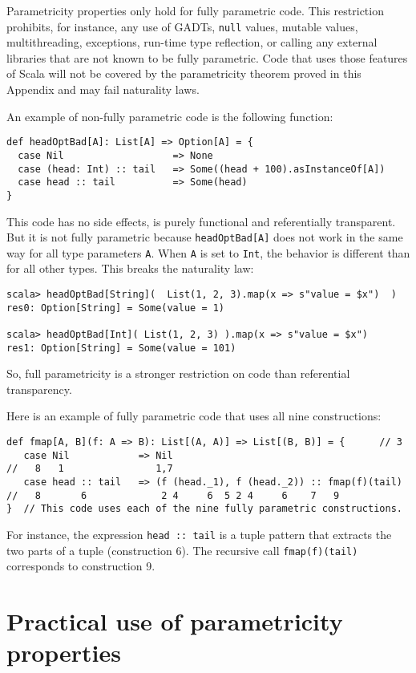 Parametricity properties only hold for fully parametric code.
This restriction prohibits, for instance, any use of GADTs,
\lstinline!null! values, mutable values, multithreading, exceptions,
run-time type reflection, or calling any external libraries that are
not known to be fully parametric. Code that uses those features of
Scala will not be covered by the parametricity theorem proved in this
Appendix and may fail naturality laws. 

An example of non-fully parametric code is the following function:
\begin{lstlisting}
def headOptBad[A]: List[A] => Option[A] = {
  case Nil                   => None
  case (head: Int) :: tail   => Some((head + 100).asInstanceOf[A])
  case head :: tail          => Some(head)
}
\end{lstlisting}
This code has no side effects, is purely functional and referentially
transparent. But it is not fully parametric because \lstinline!headOptBad[A]!
does not work in the same way for all type parameters \lstinline!A!.
When \lstinline!A! is set to \lstinline!Int!, the behavior is different
than for all other types. This breaks the naturality law:
\begin{lstlisting}
scala> headOptBad[String](  List(1, 2, 3).map(x => s"value = $x")  )
res0: Option[String] = Some(value = 1)

scala> headOptBad[Int]( List(1, 2, 3) ).map(x => s"value = $x")
res1: Option[String] = Some(value = 101)
\end{lstlisting}
So, full parametricity is a stronger restriction on code than referential
transparency.

Here is an example of fully parametric code that uses all nine constructions:
\begin{lstlisting}
def fmap[A, B](f: A => B): List[(A, A)] => List[(B, B)] = {      // 3
   case Nil            => Nil
//   8   1                1,7 
   case head :: tail   => (f (head._1), f (head._2)) :: fmap(f)(tail)
//   8       6             2 4     6  5 2 4     6    7   9
}  // This code uses each of the nine fully parametric constructions.
\end{lstlisting}
For instance, the expression \lstinline!head :: tail! is a tuple
pattern that extracts the two parts of a tuple (construction 6). The
recursive call \lstinline!fmap(f)(tail)! corresponds to construction
9.

\section{Practical use of parametricity properties}

